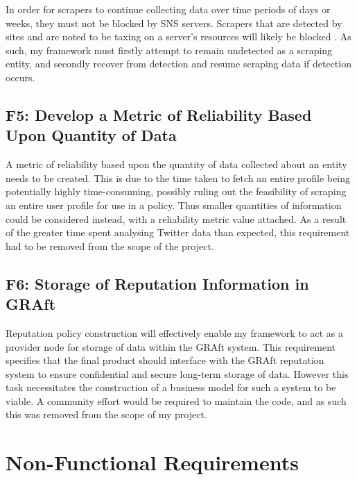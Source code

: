 In order for scrapers to continue collecting data over time periods of days or weeks, they must not be blocked by SNS servers. Scrapers that are detected by sites and are noted to be taxing on a server's resources will likely be blocked \cite{no_api_for_me}. As such, my framework must firstly attempt to remain undetected as a scraping entity, and secondly recover from detection and resume scraping data if detection occurs. 

\subsection{ F5: Develop a Metric of Reliability Based Upon Quantity of Data}

A metric of reliability based upon the quantity of data collected about an entity needs to be created. This is due to the time taken to fetch an entire profile being potentially highly time-consuming, possibly ruling out the feasibility of scraping an entire user profile for use in a policy. Thus smaller quantities of information could be considered instead, with a reliability metric value attached. As a result of the greater time spent analysing Twitter data than expected, this requirement had to be removed from the scope of the project.


\subsection{ F6: Storage of Reputation Information in GRAft}

Reputation policy construction will effectively enable my framework to act as a provider node for storage of data within the GRAft system. This requirement specifies that the final product should interface with the GRAft reputation system to ensure confidential and secure long-term storage of data. However this task necessitates the construction of a business model for such a system to be viable. A community effort would be required to maintain the code, and as such this was removed from the scope of my project. 


\section{Non-Functional Requirements}

